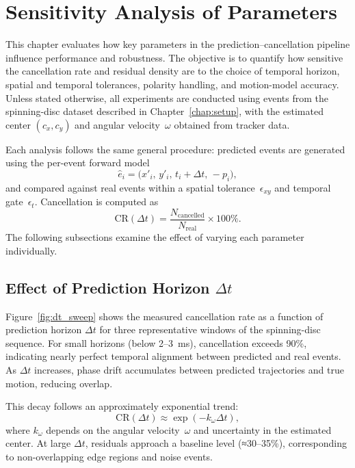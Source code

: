 \chapter{Sensitivity Analysis of Parameters}
\label{chap:metrics}

This chapter evaluates how key parameters in the prediction–cancellation pipeline influence performance and robustness. 
The objective is to quantify how sensitive the cancellation rate and residual density are to the choice of temporal horizon, spatial and temporal tolerances, polarity handling, and motion-model accuracy.
Unless stated otherwise, all experiments are conducted using events from the spinning-disc dataset described in Chapter~\ref{chap:setup}, with the estimated center \((c_x, c_y)\) and angular velocity~\(\omega\) obtained from tracker data.

Each analysis follows the same general procedure: predicted events are generated using the per-event forward model
\[
\hat{e}_i = \big(x'_i,\, y'_i,\, t_i + \Delta t,\, -p_i \big),
\]
and compared against real events within a spatial tolerance~\(\epsilon_{xy}\) and temporal gate~\(\epsilon_t\). 
Cancellation is computed as
\[
\text{CR}(\Delta t) = \frac{N_{\text{cancelled}}}{N_{\text{real}}} \times 100\%.
\]
The following subsections examine the effect of varying each parameter individually.

\section{Effect of Prediction Horizon \(\Delta t\)}
\label{sec:dt_sensitivity}

Figure~\ref{fig:dt_sweep} shows the measured cancellation rate as a function of prediction horizon \(\Delta t\) for three representative windows of the spinning-disc sequence. 
For small horizons (below 2–3~ms), cancellation exceeds 90\%, indicating nearly perfect temporal alignment between predicted and real events.
As \(\Delta t\) increases, phase drift accumulates between predicted trajectories and true motion, reducing overlap.

This decay follows an approximately exponential trend:
\[
\text{CR}(\Delta t) \approx \exp\!\left(-k_{\omega}\Delta t\right),
\]
where \(k_{\omega}\) depends on the angular velocity~\(\omega\) and uncertainty in the estimated center.
At large \(\Delta t\), residuals approach a baseline level (≈30–35\%), corresponding to non-overlapping edge regions and noise events.

